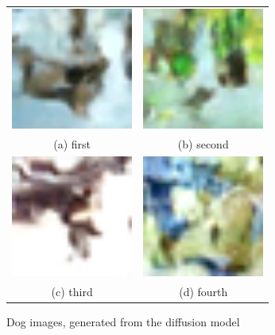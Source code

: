 \documentclass[conference]{IEEEtran}
\begin{document}
        \begin{figure}
          \begin{tabular}{cc}
            \includegraphics[width=40mm]{./images/generated-imgs/dog/0510.png} 
        &   \includegraphics[width=40mm]{./images/generated-imgs/dog/0511.png} 
        \\
          (a) first 
          & (b) second \\[6pt]
             \includegraphics[width=40mm]{./images/generated-imgs/dog/0512.png} 
          &  \includegraphics[width=40mm]{./images/generated-imgs/dog/0513.png} 
        \\
          (c) third & (d) fourth \\[6pt]
          \end{tabular}
          \caption{Dog images, generated from the diffusion model}
          \end{figure}
      
\end{document}

